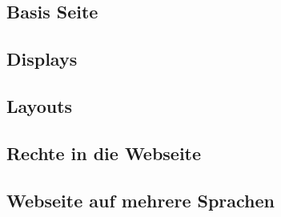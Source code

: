 \subsection{Basis Seite}



\subsection{Displays}



\subsection{Layouts}



\subsection{Rechte in die Webseite}



\subsection{Webseite auf mehrere Sprachen}


